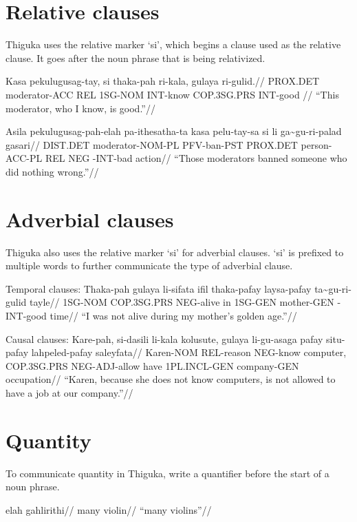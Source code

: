 \section{Relative clauses}
Thiguka uses the relative marker `si', which begins a clause used as the relative clause.
It goes after the noun phrase that is being relativized.

\ex
\begingl
    \gla  Kasa     pekulugusag-tay, si  thaka-pah ri-kala, gulaya      ri-gulid.//
    \glb              PROX.DET moderator-ACC    REL 1SG-NOM   INT-know COP.3SG.PRS INT-good //
    \glft``This moderator, who I know, is good.''//
\endgl
\xe

\ex
\begingl
    \gla  Asila    pekulugusag-pah-elah pa-ithesatha-ta kasa pelu-tay-sa       si  li  ga\~{}gu-ri-palad gasari//
    \glb              DIST.DET moderator-NOM-PL     PFV-ban-PST     PROX.DET person-ACC-PL REL NEG \agradj{}-INT-bad action//
    \glft``Those moderators banned someone who did nothing wrong.''//
\endgl
\xe


\section{Adverbial clauses}
Thiguka also uses the relative marker `si' for adverbial clauses. `si' is prefixed to
multiple words to further communicate the type of adverbial clause.

Temporal clauses:
\ex
\begingl
    \gla  Thaka-pah gulaya      li-sifata ifil thaka-pafay laysa-pafay ta\~{}gu-ri-gulid  tayle//
    \glb  1SG-NOM   COP.3SG.PRS NEG-alive in   1SG-GEN     mother-GEN  \agradj{}-INT-good time//
    \glft ``I was not alive during my mother's golden age.''//
\endgl
\xe


Causal clauses:
\ex
\begingl
    \gla  Kare-pah, si-dasili  li-kala  kolusute, gulaya      li-gu-asaga   pafay situ-pafay   lahpeled-pafay saleyfata//
    \glb  Karen-NOM REL-reason NEG-know computer, COP.3SG.PRS NEG-ADJ-allow have  1PL.INCL-GEN company-GEN    occupation//
    \glft``Karen, because she does not know computers, is not allowed to have a job at our company.''//
\endgl
\xe

\section{Quantity}
To communicate quantity in Thiguka, write a quantifier before the start of a noun phrase.

\ex
\begingl
    \gla  elah gahlirithi//
    \glb  many violin//
    \glft ``many violins''//
\endgl
\xe

